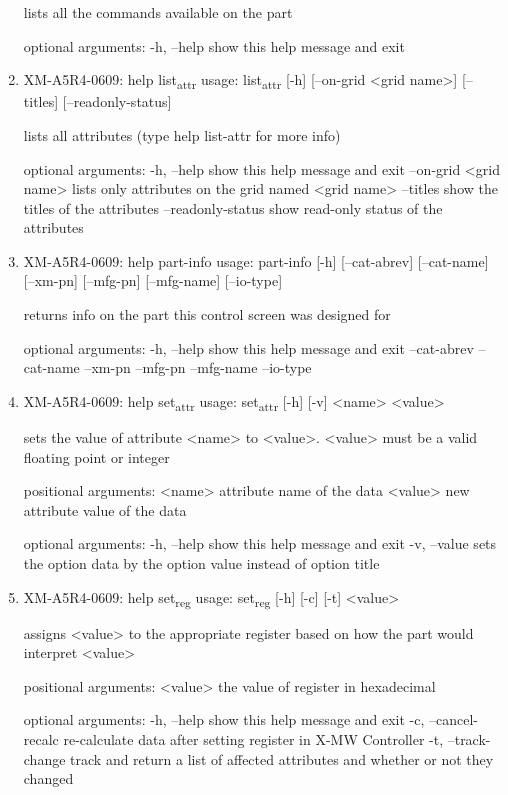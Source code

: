 \documentclass[11pt]{article}
\begin{document}
\begin{enumerate}
lists all the commands available on the part

optional arguments:
  -h, --help  show this help message and exit

\item XM-A5R4-0609: help list\textsubscript{attr}
\label{sec:orgb3b2853}
usage: list\textsubscript{attr} [-h] [--on-grid <grid name>] [--titles] [--readonly-status]

lists all attributes (type help list-attr for more info)

optional arguments:
  -h, --help            show this help message and exit
  --on-grid <grid name>
                        lists only attributes on the grid named <grid name>
  --titles              show the titles of the attributes
  --readonly-status     show read-only status of the attributes

\item XM-A5R4-0609: help part-info
\label{sec:orgba26d1b}
usage: part-info  [-h] [--cat-abrev] [--cat-name] [--xm-pn] [--mfg-pn] [--mfg-name]
        [--io-type]

returns info on the part this control screen was designed for

optional arguments:
  -h, --help   show this help message and exit
  --cat-abrev
  --cat-name
  --xm-pn
  --mfg-pn
  --mfg-name
  --io-type

\item XM-A5R4-0609: help set\textsubscript{attr}
\label{sec:orgd8caa24}
usage: set\textsubscript{attr} [-h] [-v] <name> <value>

sets the value of attribute <name> to <value>. <value> must be a valid
floating point or integer

positional arguments:
  <name>       attribute name of the data
  <value>      new attribute value of the data

optional arguments:
  -h, --help   show this help message and exit
  -v, --value  sets the option data by the option value instead of option
               title

\item XM-A5R4-0609: help set\textsubscript{reg}
\label{sec:orgb63da00}
usage: set\textsubscript{reg} [-h] [-c] [-t] <value>

assigns <value> to the appropriate register based on how the part would
interpret <value>

positional arguments:
  <value>              the value of register in hexadecimal

optional arguments:
  -h, --help           show this help message and exit
  -c, --cancel-recalc  re-calculate data after setting register in X-MW
                       Controller
  -t, --track-change   track and return a list of affected attributes and
                       whether or not they changed


\end{enumerate}
\end{document}
